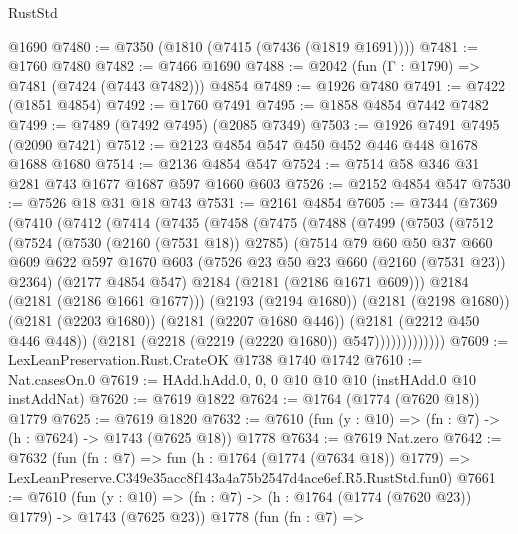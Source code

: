 \begin{lexlean}{RustStd}
\begin{coremodule}
    @1690
@7480 := @7350 (@1810 (@7415 (@7436 (@1819 @1691))))
@7481 := @1760 @7480
@7482 := @7466 @1690
@7488 := @2042 (fun (Γ : @1790) => @7481 (@7424 (@7443 @7482))) @4854
@7489 := @1926 @7480
@7491 := @7422 (@1851 @4854)
@7492 := @1760 @7491
@7495 := @1858 @4854 @7442 @7482
@7499 := @7489 (@7492 @7495) (@2085 @7349)
@7503 := @1926 @7491 @7495 (@2090 @7421)
@7512 := @2123 @4854 @547 @450 @452 @446 @448 @1678 @1688 @1680
@7514 := @2136 @4854 @547
@7524 := @7514 @58 @346 @31 @281 @743 @1677 @1687 @597 @1660 @603
@7526 := @2152 @4854 @547
@7530 := @7526 @18 @31 @18 @743
@7531 := @2161 @4854
@7605 := @7344
    (@7369
      (@7410
        (@7412
          (@7414
            (@7435
              (@7458
                (@7475
                  (@7488
                    (@7499
                      (@7503
                        (@7512
                          (@7524
                            (@7530 (@2160 (@7531 @18)) @2785)
                            (@7514
                              @79
                              @60
                              @50
                              @37
                              @660
                              @609
                              @622
                              @597
                              @1670
                              @603
                              (@7526 @23 @50 @23 @660 (@2160 (@7531 @23)) @2364)
                              (@2177 @4854 @547)
                              @2184
                              (@2181 (@2186 @1671 @609)))
                            @2184
                            (@2181 (@2186 @1661 @1677)))
                          (@2193 (@2194 @1680))
                          (@2181 (@2198 @1680))
                          (@2181 (@2203 @1680))
                          (@2181 (@2207 @1680 @446))
                          (@2181 (@2212 @450 @446 @448))
                          (@2181 (@2218 (@2219 (@2220 @1680)) @547)))))))))))))
@7609 := LexLeanPreservation.Rust.CrateOK @1738 @1740 @1742
@7610 := Nat.casesOn.{0}
@7619 := HAdd.hAdd.{0, 0, 0} @10 @10 @10 (instHAdd.{0} @10 instAddNat)
@7620 := @7619 @1822
@7624 := @1764 (@1774 (@7620 @18)) @1779
@7625 := @7619 @1820
@7632 := @7610 (fun (y : @10) => (fn : @7) -> (h : @7624) -> @1743 (@7625 @18)) @1778
@7634 := @7619 Nat.zero
@7642 := @7632
    (fun (fn : @7) =>
    fun (h : @1764 (@1774 (@7634 @18)) @1779) =>
    LexLeanPreserve.C349e35acc8f143a4a75b2547d4ace6ef.R5.RustStd.fun0)
@7661 := @7610
    (fun (y : @10) => (fn : @7) -> (h : @1764 (@1774 (@7620 @23)) @1779) -> @1743 (@7625 @23))
    @1778
    (fun (fn : @7) =>

\end{coremodule}
\end{lexlean}
